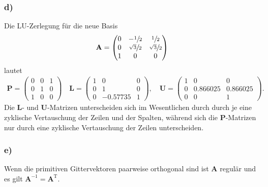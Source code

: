 \documentclass{scrartcl}
\begin{document}
        \subsubsection*{d)}

            Die LU-Zerlegung für die neue Basis 
            \[
                \mathbf{A} =
                \begin{pmatrix}
                    0 & -\sfrac{1}{2} & \sfrac{1}{2} \\
                    0 & \sfrac{\sqrt{3}}{2} & \sfrac{\sqrt{3}}{2} \\
                    1 & 0 & 0 \\
                \end{pmatrix}
            \]
            lautet 
            \begin{align*}
                \mathbf{P} = 
               \begin{pmatrix}
                   0 & 0 & 1 \\
                   0 & 1 & 0 \\
                   1 & 0 & 0 
               \end{pmatrix}
               \quad
               \mathbf{L} =
               \begin{pmatrix}
                   1 & 0 & 0 \\
                   0 & 1 & 0 \\
                   0 & -0.57735 & 1 
               \end{pmatrix},
               \quad
               \mathbf{U} = 
               \begin{pmatrix}
                   1 & 0 & 0 \\
                   0 & 0.866025 & 0.866025 \\
                   0 & 0 & 1 
               \end{pmatrix}.
            \end{align*}
            Die $\mathbf{L}$- und $\mathbf{U}$-Matrizen unterscheiden sich im Wesentlichen durch durch je eine zyklische Vertauschung der Zeilen und der Spalten, 
            während sich die $\mathbf{P}$-Matrizen nur durch eine zyklische Vertauschung der Zeilen unterscheiden.

        \subsubsection*{e)}

            Wenn die primitiven Gittervektoren paarweise orthogonal sind ist $\mathbf{A}$ regulär und es gilt $\mathbf{A}^{-1} = \mathbf{A}^{\text{T}}$.
\end{document}
